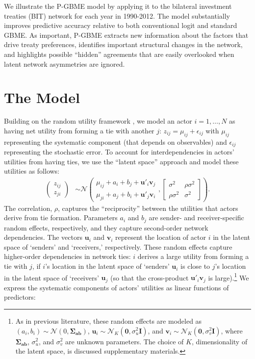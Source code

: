 \documentclass[a4paper, 12pt]{article}
\begin{document}
We illustrate the P-GBME model by applying it to the bilateral investment treaties (BIT) network for each year in 1990-2012. The model substantially improves predictive accuracy relative to both conventional logit and standard GBME. As important, P-GBME extracts new information about the factors that drive treaty preferences, identifies important structural changes in the network, and highlights possible ``hidden'' agreements that are easily overlooked when latent network asymmetries are ignored.

\section{The Model}

Building on the random utility framework \citep{mcfadden:1980}, we model an actor $i = 1, \ldots,  N$ as having net utility from forming a tie with another $j$: $z_{ij} = \mu_{ij} + \epsilon_{ij}$ with $\mu_{ij}$ representing the systematic component (that depends on observables) and $\epsilon_{ij}$ representing the stochastic error. To account for interdependencies in actors' utilities from having ties, we use the ``latent space'' approach \citep{hoff:2005} and model these utilities as follows:
\begin{align}    
\left ( \begin{array}{c}
         z_{ij} \\
         z_{ji} \end{array} \right ) 
         & \sim \mathcal{N}
        \left ( \begin{array}{c}
         \mu_{ij} + a_i + b_j +    \bm{u}'_i\bm{v}_j  \\
         \mu_{ji} + a_j + b_i +  \bm{u}'_j\bm{v}_i \end{array}, \left [ \begin{array}{cc}
        \sigma^2 & \rho \sigma^2 \\
         \rho \sigma^2 & \sigma^2 \end{array} \right] \right ). \label{eq:modz}
\end{align}
The correlation, $\rho$, captures the ``reciprocity'' between the utilities that actors derive from tie formation. Parameters $a_i$ and $b_j$ are sender- and receiver-specific random effects, respectively, and they capture second-order network dependencies. The vectors $\bm{u}_i$ and $\bm{v}_i$ represent the location of actor $i$ in the latent space of `senders' and `receivers,' respectively. These random effects capture higher-order dependencies in network ties: $i$ derives a large utility from forming a tie with $j$, if $i$'s location in the latent space of `senders' $\bm{u}_i$ is close to $j$'s location in the latent space of `receivers' $\bm{u}_j$ (so that the cross-product $\bm{u}'_i\bm{v}_j$ is large).\footnote{As in previous literature, these random effects are modeled as $(a_i, b_i) \sim \mathcal{N}(0, \bm{\Sigma_{ab}})$, $\bm{u}_i \sim \mathcal{N}_K(\bm{0}, \sigma_u^2\bm{I})$, and $\bm{v}_i \sim \mathcal{N}_K(\bm{0}, \sigma_v^2\bm{I})$, where $\bm{\Sigma_{ab}}$, $\sigma_u^2$, and $\sigma_v^2$ are unknown parameters. The choice of $K$, dimensionality of the latent space, is discussed supplementary materials.} We express the systematic components of actors' utilities as linear functions of predictors:
\end{document}
